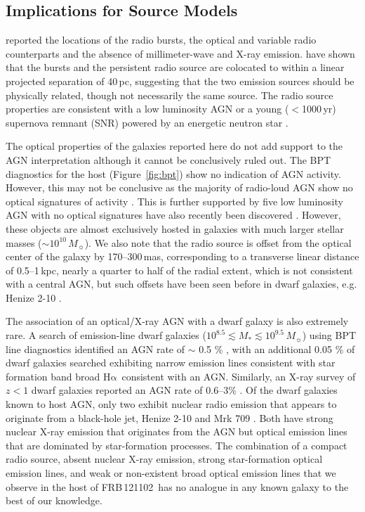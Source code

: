 \documentclass[twocolumn]{aastex61}
\def \frb {FRB\,121102}
\def \halpha {\ensuremath{\mathrm{H\alpha}}}
\begin{document}
\subsection{Implications for Source Models}
\citet{clw+16} reported the locations of the radio bursts, the optical and variable radio counterparts and the absence of millimeter-wave and X-ray emission. \citet{mph+16} have shown that the bursts and the persistent radio source are colocated to within a linear projected separation of 40\,pc, suggesting that the two emission sources should be physically related, though not necessarily the same source. The radio source properties are consistent with a low luminosity AGN or a young ($<$1000\,yr) supernova remnant (SNR) powered by an energetic neutron star \citep[e.g. ][]{mkm16}. 

The optical properties of the galaxies reported here do not add support to the AGN interpretation although it cannot be conclusively ruled out. The BPT diagnostics for the host (Figure~\ref{fig:bpt}) show no indication of AGN activity. However, this may not be conclusive as the majority of radio-loud AGN show no optical signatures of activity \citep{ms07}. This is further supported by five low luminosity AGN with no optical signatures have also recently been discovered \citep{pyop16}. However, these objects are almost exclusively hosted in galaxies with much larger stellar masses ($\sim10^{10}\,M_\sun$).
We also note that the radio source is offset from the optical center of the galaxy by 170--300\,mas, corresponding to a transverse linear distance of 0.5--1\,kpc, nearly a quarter to half of the radial extent, which is not consistent with a central AGN, but such offsets have been seen before in dwarf galaxies, e.g. Henize 2-10 \citep{rsjb11}. 

The association of an optical/X-ray AGN with a dwarf galaxy is also extremely rare. A search of emission-line dwarf galaxies ($10^{8.5} \lesssim M_* \lesssim 10^{9.5}\,M_\sun$) using BPT line diagnostics identified an AGN rate of $\sim$ 0.5 \% \citep{rgg13}, with an additional 0.05 \% of dwarf galaxies searched exhibiting narrow emission lines consistent with star formation band broad \halpha\ consistent with an AGN. Similarly, an X-ray survey of $z<1$ dwarf galaxies reported an AGN rate of 0.6--3\% \citep{pgg+16}. Of the dwarf galaxies known to host AGN, only two exhibit nuclear radio emission that appears to originate from a black-hole jet, Henize 2-10 and Mrk 709 \citep{rsjb11,rpr+14}.  Both have strong nuclear X-ray emission that originates from the AGN but optical emission lines that are dominated by star-formation processes. The combination of a compact radio source, absent nuclear X-ray emission, strong star-formation optical emission lines, and weak or non-existent broad optical emission lines that we observe in the host of \frb\ has no analogue in any known galaxy to the best of our knowledge. 
\end{document}
